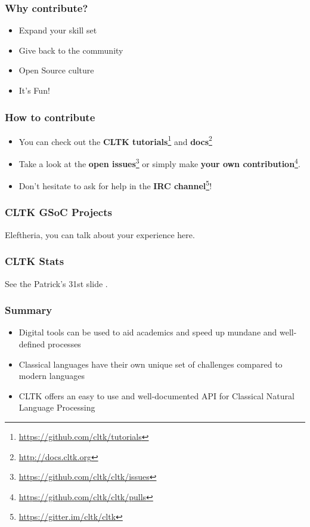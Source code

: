 \documentclass{beamer}
\begin{document}
\begin{frame}
\frametitle{Why contribute?}
\begin{itemize}
    \item Expand your skill set
    \item Give back to the community
    \item Open Source culture
    \item It’s Fun!
\end{itemize}
\end{frame}




\begin{frame}
\frametitle{How to contribute}
\begin{itemize}
    \item You can check out the \textbf{CLTK tutorials}\footnote{\href{https://github.com/cltk/tutorials}{https://github.com/cltk/tutorials}} and \textbf{docs}\footnote{\href{http://docs.cltk.org}{http://docs.cltk.org}}
    \item Take a look at the \textbf{open issues}\footnote{\href{https://github.com/cltk/cltk/issues}{https://github.com/cltk/cltk/issues}} or simply make \textbf{your own contribution}\footnote{\href{https://github.com/cltk/cltk/pulls}{https://github.com/cltk/cltk/pulls}}.
    \item Don’t hesitate to ask for help in the \textbf{IRC channel}\footnote{\href{https://gitter.im/cltk/cltk}{https://gitter.im/cltk/cltk}}!
\end{itemize}
\end{frame}

\begin{frame}
\frametitle{CLTK GSoC Projects}

Eleftheria, you can talk about your experience here.
\end{frame}


\begin{frame}
\frametitle{CLTK Stats}

See the Patrick's 31st slide .
\end{frame}



\begin{frame}
\frametitle{Summary}
\begin{itemize}
    \item Digital tools can be used to aid academics and speed up mundane and well-defined processes
    \item Classical languages have their own unique set of challenges compared to modern languages
    \item CLTK offers an easy to use and well-documented API for Classical Natural Language Processing
\end{itemize}
\end{frame}
\end{document}
